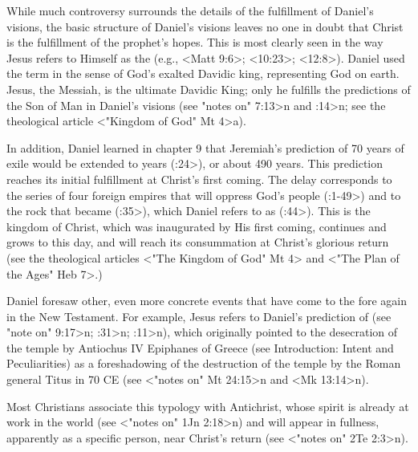 While much controversy surrounds the details of the fulfillment of Daniel's visions, the basic structure of Daniel's visions leaves no one in doubt that Christ is the fulfillment of the prophet's hopes.
This is most clearly seen in the way Jesus refers to Himself as the  (e.g., <Matt 9:6>; <10:23>; <12:8>).
Daniel used the term in the sense of God's exalted Davidic king, representing God on earth.
Jesus, the Messiah, is the ultimate Davidic King; only he fulfills the predictions of the Son of Man in Daniel's visions (see \<"notes on" 7:13>n and :14>n; see the theological article 
<"Kingdom of God" Mt 4>a). 

In addition, Daniel learned in chapter 9 that Jeremiah's prediction of 70 years of exile would be extended 
to  years (:24>), or about 490 years.
This prediction reaches its initial fulfillment at Christ's first coming. The delay corresponds to the series of four foreign empires that will oppress God's people (:1-49>) and to the rock that became  (:35>), which Daniel refers to as  (:44>). 
This is the kingdom of Christ, which was inaugurated by His first coming, continues and grows to this day, and will reach its consummation at Christ's glorious return (see the theological articles <"The Kingdom of God"  Mt 4> and <"The Plan of the Ages"  Heb 7>.)

Daniel foresaw other, even more concrete events that have come to the fore again in the New Testament.
For example, Jesus refers to Daniel's prediction of  (see \<"note on" 9:17>n; :31>n; :11>n),
which originally pointed to the desecration of the temple by Antiochus IV Epiphanes of Greece (see Introduction: Intent and Peculiarities) as a foreshadowing of the destruction of the temple by the Roman general Titus in 70 CE (see <"notes on" Mt 24:15>n and <Mk 13:14>n).

Most Christians associate this typology with Antichrist, whose spirit is already at work in the world (see <"notes on" 1Jn 2:18>n) and will appear in fullness, apparently as a specific person, near Christ's return (see <"notes on" 2Te 2:3>n).


